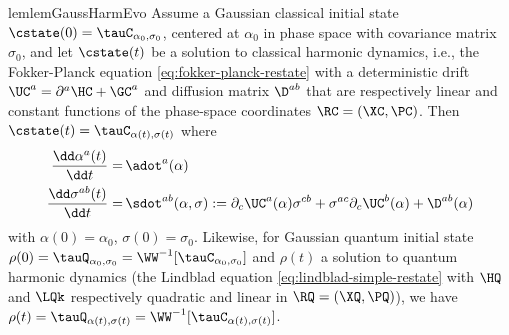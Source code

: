 \documentclass{article}
\numberwithin{equation}{section}
\begin{document}
\begin{restatable}{lem}{lemGaussHarmEvo}
    \label{lem:gaussian_evolution}
    Assume a Gaussian classical initial state $\cstate(0)=\tauC_{\alpha_0,\sigma_0}$, centered at $\alpha_0$ in phase space with covariance matrix $\sigma_0$, and let $\cstate(t)$ be a solution to classical harmonic dynamics, i.e., the Fokker-Planck equation \eqref{eq:fokker-planck-restate} with a deterministic drift $\UC^a = \partial^a\HC+\GC^a$ and diffusion matrix $\D^{ab}$ that are respectively linear and constant functions of the phase-space coordinates $\RC=(\XC,\PC)$. Then 
    $\cstate(t)=\tauC_{\alpha(t),\sigma(t)}$ where
    \begin{align}
        \label{eq:adot}
        \frac{\dd \alpha^a(t)}{\dd t} 
         =&\, \adot^a(\alpha)
         \\
        \label{eq:sdot}
        \frac{\dd \sigma^{ab}(t)}{\dd t} 
        =&\, \sdot^{ab}(\alpha,\sigma) 
        := \partial_c\UC^a(\alpha)\sigma^{cb}+\sigma^{ac}\partial_c\UC^b(\alpha)+ \D^{ab}(\alpha)
    \end{align}
    with $\alpha(0) = \alpha_0$, $\sigma(0) = \sigma_0$. Likewise, for Gaussian quantum initial state $\rho(0)=\tauQ_{\alpha_0,\sigma_0}=\WW^{-1}[\tauC_{\alpha_0,\sigma_0}]$ and $\rho(t)$ a solution to quantum harmonic dynamics (the Lindblad equation \eqref{eq:lindblad-simple-restate} with  $\HQ$ and $\LQk$ respectively quadratic and linear in $\RQ=(\XQ,\PQ)$), we have 
    $\rho(t)=\tauQ_{\alpha(t),\sigma(t)}=\WW^{-1}[\tauC_{\alpha(t),\sigma(t)}]$.
\end{restatable}
\end{document}
